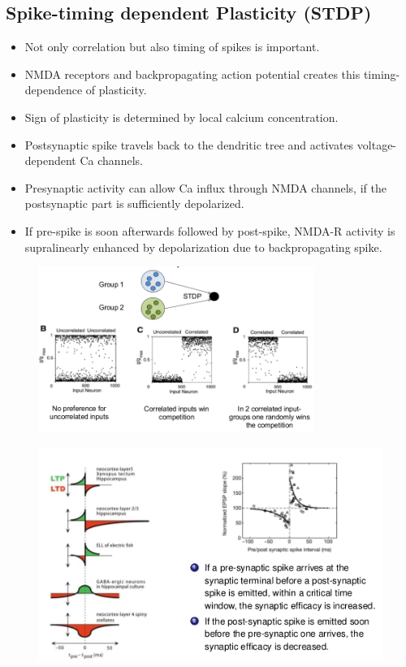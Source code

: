 \documentclass[a4paper, 12pt]{article}
\begin{document}
\subsection{Spike-timing dependent Plasticity (STDP)}
\begin{itemize}[noitemsep,nolistsep]
	\item Not only correlation but also timing of spikes is important.
	\item NMDA receptors and backpropagating action potential creates this timing-dependence of plasticity.
	\item Sign of plasticity is determined by local calcium concentration.
	\item Postsynaptic spike travels back to the dendritic tree and activates voltage-dependent Ca channels.
	\item Presynaptic activity can allow Ca influx through NMDA channels, if the postsynaptic part is sufficiently depolarized.
	\item If pre-spike is soon afterwards followed by post-spike, NMDA-R activity is supralinearly enhanced by depolarization due to backpropagating spike.
\end{itemize}

\begin{figure}[H]
	\centering
	\includegraphics[width=0.8\textwidth]{STDP-consequences.png}
\end{figure}

\begin{figure}[H]
	\centering
	\includegraphics[scale=1]{8_1.jpg}
\end{figure} 
\end{document}

